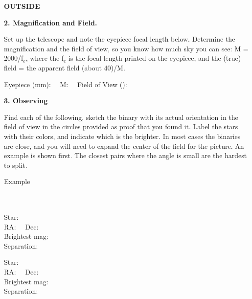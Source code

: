 \documentclass[12pt]{article}
\begin{document}
\bigskip
\noindent
{\bf OUTSIDE}

\bigskip
\noindent
{\bf 2. Magnification and Field.}

\medskip\noindent Set up the telescope and note the eyepiece focal length
below.
Determine the
magnification and the field of view, so you know how much sky you can
see: 
M = 2000/f$_e$, where the f$_e$
is the focal length printed on the eyepiece, and the (true) field =
the apparent field (about 40\deg)/M. 

\medskip\noindent 
Eyepiece (mm):
\makebox[2cm]{\hrulefill} \ \ M: \makebox[2cm]{\hrulefill}
\ \ Field of View (\arcmin):\makebox[2cm]{\hrulefill}

\bigskip\noindent
{\bf 3. Observing}

\medskip\noindent
Find each of the following, sketch the binary with its actual
orientation in the field of view in the circles provided as proof that
you found it.  Label the stars with their colors, and indicate which
is the brighter. In most cases the binaries are close, and you will
need to expand the center of the field for the picture.  An example is
shown first.  The closest pairs where the angle is small are the
hardest to split.

\bigskip 
       

\parbox[b]{8cm}{ Example\\
 \\ \\ }  \begin{minipage}[b]{8cm}{}\end{minipage}

\bigskip\noindent 

\parbox[b]{8cm}{ Star: \makebox[3cm]{\hrulefill}\\
RA: \makebox[1.5cm]{\hrulefill} \ \ Dec: \makebox[1.5 cm]{\hrulefill} \\
Brightest mag: \makebox[1cm]{\hrulefill} \\
Separation:  \makebox[1cm]{\hrulefill} \\ }   \begin{minipage}[b]{8cm}{}\end{minipage}

\bigskip\noindent 


\parbox[b]{8cm}{ Star: \makebox[3cm]{\hrulefill}\\
RA: \makebox[1.5cm]{\hrulefill} \ \ Dec: \makebox[1.5 cm]{\hrulefill} \\
Brightest mag: \makebox[1cm]{\hrulefill} \\
Separation:  \makebox[1cm]{\hrulefill} \\ }   \begin{minipage}[b]{8cm}{}\end{minipage}
\end{document}
